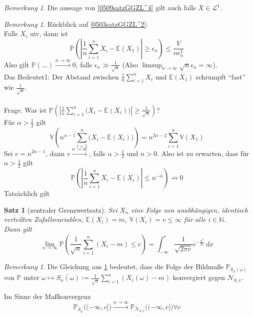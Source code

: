 \documentclass[10pt,a4paper]{article}
\newcommand{\N}{\ensuremath{\mathbb{N}}}
\newcommand{\al}{\ensuremath{\alpha}}
\newcommand{\ol}[1]{\overline{#1}}
\newcommand{\abs}[1]{\left|#1\right|}
\newcommand{\Prb}{\mathbb P}
\newcommand{\Epv}{\ensuremath{\mathbb{E}}}
\newcommand{\Var}{\mathbb{V}}
\newcommand{\scL}{\mathscr L}
\newcommand{\Nv}{\mathscr N}
\theoremstyle{plain}
\newtheorem{satz}[theorem]{Satz}
\theoremstyle{definition}
\theoremstyle{remark}
\newtheorem{bem}[theorem]{Bemerkung}
\begin{document}
	\begin{bem}
		Die aussage von \ref{0509satzGGZL^4} gilt auch falls $X\in\scL^1$.
	\end{bem}

	\begin{bem}
		Rückblick auf \ref{0503satzGGZL^2}:\\
		Falls $X_i$ uiv, dann ist
		\[\Prb\left(\abs{\frac{1}{n}\sum_{i=1}^{n}X_i-\Epv(X_1)}\geq \epsilon_n\right)\leq\frac{V}{n\epsilon_n^2}\]
		Also gilt $\Prb(...)\xrightarrow{n\to\infty}0$, falls $\epsilon_n\gg\frac{1}{\sqrt{n}}$ (Also $\limsup_{n\to\infty}\sqrt{n}\epsilon_n=\infty$).\\
		Das Bedeutet1: Der Abstand zwischen $\frac{1}{n}\sum_{i=1}^{n}X_i$ und $\Epv(X_1)$ schrumpft \enquote{fast} wie $\frac{1}{\sqrt{n}}$.\\
		\\
		Frage: Was ist $\Prb\left(\abs{\frac{1}{n}\sum_{i=1}^{n}\big(X_i-\Epv(X_i)\big)}\geq\frac{1}{\sqrt{n}}\right)$?\\
		Für $\al>\frac{1}{2}$ gilt
		\[\Var\left(n^{\al-1}\sum_{i=1}^{n}\big(X_i-\Epv(X_i)\big)\right)=n^{2\al-2}\sum_{i=1}^{n}\Var(X_1)\]
		Sei $v=n^{2\al-1}$, dann $v\xrightarrow{n\to\infty}$, falls $\al>\frac{1}{2}$ und $n>0$.
		Also ist zu erwarten, dass für $\al>\frac{1}{2}$ gilt
		\[\Prb\left(\abs{\frac{1}{n}\sum_{i=1}^{n}X_i-\Epv(X_i)}\leq n^{-\al}\right)\not\to 0\]
		Tatsächlich gilt
	\end{bem}

	\begin{satz}[zentraler Grenzwertsatz]\label{0512satzZentrGrenzw}
		Sei $X_n$ eine Folge von unabhängigen, identisch verteilten Zufallsvariablen, $\Epv(X_i)=m$, $\Var(X_i)=v\leq\infty$ für alle $i\in\N$.\\
		Dann gilt
		\[\lim\limits_{n\to\infty}\Prb\left(\frac{1}{\sqrt{n}}\sum_{i=1}^{n}(X_i-m)\leq c\right)=\int_{-\infty}^{c}\frac{1}{\sqrt{2\pi v}}e^{-\frac{x^2}{2v}}~dx\]
	\end{satz}

	\begin{bem}
		Die Gleichung aus \ref{0512satzZentrGrenzw} bedeutet, dass die Folge der Bildmaße $\Prb_{\ol S_n(\omega)}$ von $\Prb$ unter $\omega\mapsto\ol{S_n(\omega)}:=\frac{1}{\sqrt{n}}\sum_{i=1}^{n}(X_i(\omega)-m)$
		konvergiert gegen $\Nv_{0,v}$.
		
		Im Sinne der Maßkonvergenz
		\[\Prb_{\ol S_n}\big((-\infty,c]\big)\xrightarrow{n\to\infty}\Prb_{\Nv_{0,v}}\big((-\infty,c]\big)\forall c\]
	\end{bem}
\end{document}
